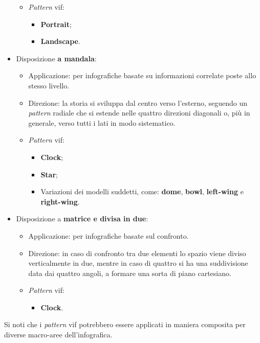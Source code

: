 \begin{itemize}
\begin{itemize}
        \item \emph{Pattern} \gls{vif}:
        \begin{itemize}
            \item \textbf{Portrait};
            \item \textbf{Landscape}.
        \end{itemize}
    \end{itemize}
    \item Disposizione \textbf{a mandala}:
    \begin{itemize}
        \item Applicazione: per infografiche basate su informazioni correlate poste allo stesso livello.
        \item Direzione: la storia si sviluppa dal centro verso l'esterno, seguendo un \emph{pattern} radiale che si estende nelle quattro direzioni diagonali o, più in generale, verso tutti i lati in modo sistematico.
        \item \emph{Pattern} \gls{vif}:
        \begin{itemize}
            \item \textbf{Clock};
            \item \textbf{Star};
            \item Variazioni dei modelli suddetti, come: \textbf{dome}, \textbf{bowl}, \textbf{left-wing} e \textbf{right-wing}.
        \end{itemize}
    \end{itemize}
    \item Disposizione a \textbf{matrice e divisa in due}:
    \begin{itemize}
        \item Applicazione: per infografiche basate sul confronto.
        \item Direzione: in caso di confronto tra due elementi lo spazio viene diviso verticalmente in due, mentre in caso di quattro si ha una suddivisione data dai quattro angoli, a formare una sorta di piano cartesiano.
        \item \emph{Pattern} \gls{vif}:
        \begin{itemize}
            \item \textbf{Clock}.
        \end{itemize}
    \end{itemize}
\end{itemize}
Si noti che i \emph{pattern} \gls{vif} potrebbero essere applicati in maniera composita per diverse macro-aree dell'infografica.

